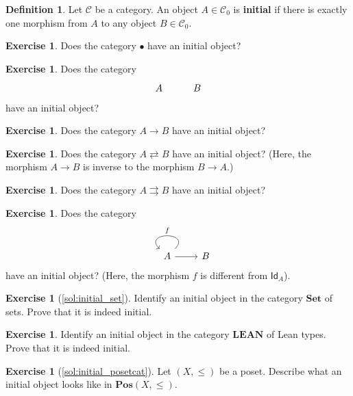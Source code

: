 \documentclass[a4paper,10pt]{scrartcl}
\theoremstyle{plain}
\theoremstyle{definition}
\newtheorem{dfn}[thm]{Definition}
\newtheorem{exer}[thm]{Exercise}
\newcommand{\cfont}[1]{\ensuremath{\mathsf{#1}}}
\newcommand{\Cat}[1]{\mathcal{#1}}
\newcommand{\CC}{\Cat{C}}
\newcommand{\Catb}[1]{\mathbf{#1}}
\newcommand{\SET}{\Catb{Set}}
\newcommand{\POS}{\Catb{Pos}}
\newcommand{\LEAN}{\Catb{LEAN}}
\newcommand{\Ob}[1]{{#1}_0}
\newcommand{\Id}[1][]{\cfont{Id}_{#1}}
\begin{document}
\begin{dfn}
  Let $\CC$ be a category. An object $A \in \Ob{\CC}$ is \textbf{initial} if there is exactly one morphism from $A$ to any object $B \in \Ob{\CC}$.
\end{dfn}

\begin{exer}
  Does the category $\bullet$ have an initial object?
\end{exer}

\begin{exer}
  Does the category 
  \[ 
  \begin{tikzcd}
  	A & B
  \end{tikzcd}  
   \] 
  have an initial object?
\end{exer}


\begin{exer}
  Does the category $A \to B$ have an initial object?
\end{exer}

\begin{exer}
  Does the category $A \rightleftarrows B$ have an initial object? (Here, the morphism $A \to B$ is inverse to the morphism $B \to A$.)
\end{exer}

\begin{exer}
  Does the category $A \rightrightarrows B$ have an initial object?
\end{exer}

\begin{exer}
  Does the category 
  \[
  \begin{tikzcd}
  A \arrow[r] \arrow[loop, swap, looseness=4, "f"] & B
  \end{tikzcd}
  \]
  have an initial object? (Here, the morphism $f$ is different from $\Id[A]$).
\end{exer}

\begin{exer}[\cref{sol:initial_set}]\label{exer:initial_set}
  Identify an initial object in the category $\SET$ of sets.
  Prove that it is indeed initial.
\end{exer}

\begin{exer}
  Identify an initial object in the category $\LEAN$ of Lean types.
  Prove that it is indeed initial.
\end{exer}

\begin{exer}[\cref{sol:initial_posetcat}]\label{exer:initial_posetcat}
  Let $(X,\leq)$ be a poset. Describe what an initial object looks like in  $\POS(X,\leq)$.
\end{exer}
\end{document}
